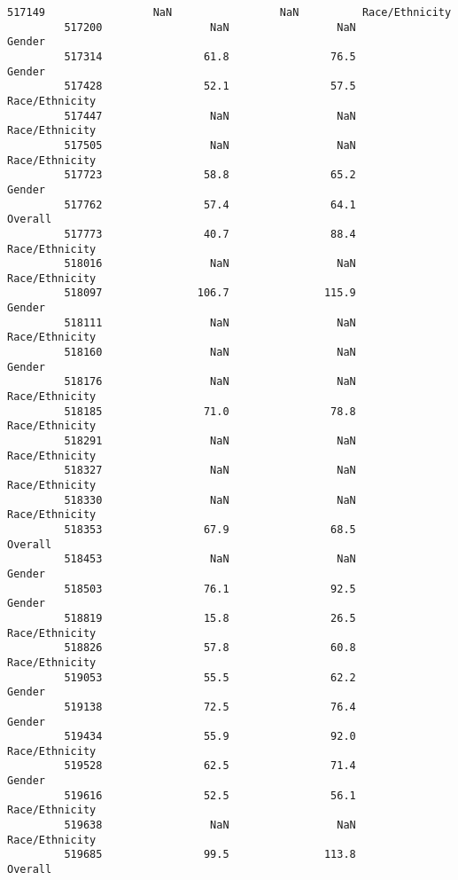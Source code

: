 \documentclass[11pt]{article}
\begin{document}
\begin{Verbatim}[commandchars=\\\{\}]
         517149                 NaN                 NaN          Race/Ethnicity   
         517200                 NaN                 NaN                  Gender   
         517314                61.8                76.5                  Gender   
         517428                52.1                57.5          Race/Ethnicity   
         517447                 NaN                 NaN          Race/Ethnicity   
         517505                 NaN                 NaN          Race/Ethnicity   
         517723                58.8                65.2                  Gender   
         517762                57.4                64.1                 Overall   
         517773                40.7                88.4          Race/Ethnicity   
         518016                 NaN                 NaN          Race/Ethnicity   
         518097               106.7               115.9                  Gender   
         518111                 NaN                 NaN          Race/Ethnicity   
         518160                 NaN                 NaN                  Gender   
         518176                 NaN                 NaN          Race/Ethnicity   
         518185                71.0                78.8          Race/Ethnicity   
         518291                 NaN                 NaN          Race/Ethnicity   
         518327                 NaN                 NaN          Race/Ethnicity   
         518330                 NaN                 NaN          Race/Ethnicity   
         518353                67.9                68.5                 Overall   
         518453                 NaN                 NaN                  Gender   
         518503                76.1                92.5                  Gender   
         518819                15.8                26.5          Race/Ethnicity   
         518826                57.8                60.8          Race/Ethnicity   
         519053                55.5                62.2                  Gender   
         519138                72.5                76.4                  Gender   
         519434                55.9                92.0          Race/Ethnicity   
         519528                62.5                71.4                  Gender   
         519616                52.5                56.1          Race/Ethnicity   
         519638                 NaN                 NaN          Race/Ethnicity   
         519685                99.5               113.8                 Overall   
         

\end{Verbatim}
\end{document}
